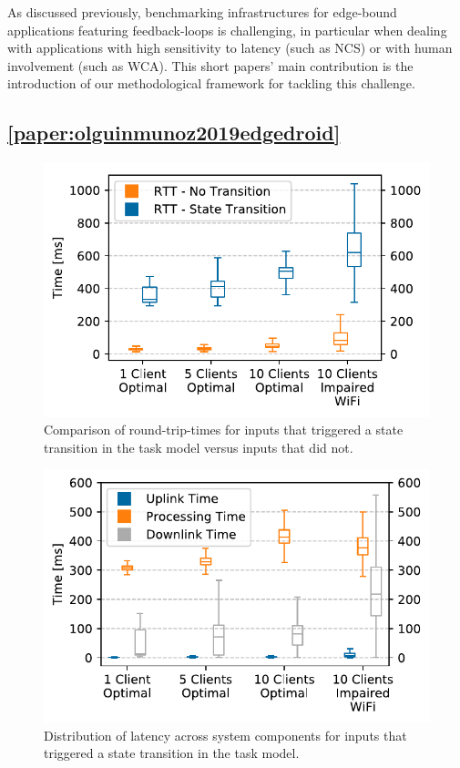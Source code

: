 As discussed previously, benchmarking infrastructures for edge-bound applications featuring feedback-loops is challenging, in particular when dealing with applications with high sensitivity to latency (such as \ac{NCS}) or with human involvement (such as \ac{WCA}).
This short papers' main contribution is the introduction of our methodological framework for tackling this challenge.


\subsection{\cref{paper:olguinmunoz2019edgedroid}}\label{summary:2019edgedroid}

\begin{figure}
    \centering%
    \includegraphics[width=.85\columnwidth]{publications/2019EdgeDroid/plots/comparison/nofonts/rtt_fb_vs_nofb}%
    \caption{Comparison of round-trip-times for inputs that triggered a state transition in the task model versus inputs that did not.}%
    \label{fig:comparison:rtt}%
\end{figure}%
\begin{figure}
    \centering%
    \includegraphics[width=.85\columnwidth]{publications/2019EdgeDroid/plots/comparison/nofonts/box_feedback}%
    \caption{Distribution of latency across system components for inputs that triggered a state transition in the task model.}%
    \label{fig:comparison:feedback}%
\end{figure}%
